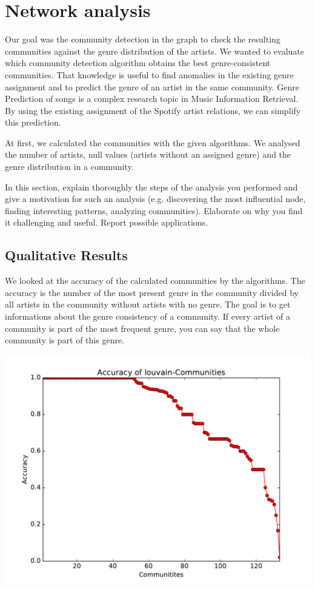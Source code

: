 \documentclass[11pt,a4paper,onecolumn,notitlepage]{article}
\begin{document}
\section{Network analysis}
Our goal was the community detection in the graph to check the resulting communities against the genre distribution of the artists. We wanted to evaluate which community detection algorithm obtains the best genre-consistent communities. That knowledge is useful to find anomalies in the existing genre assignment and to predict the genre of an artist in the same community. Genre Prediction of songs is a complex research topic in Music Information Retrieval. By using the existing assignment of the Spotify artist relations, we can simplify this prediction.

At first, we calculated the communities with the given algorithms. We analysed the number of artists, null values (artists without an assigned genre) and the genre distribution in a community.

In this section, explain thoroughly the steps of the analysis you performed and give a motivation for such an analysis (e.g. discovering the most influential node, finding interesting patterns, analyzing communities). Elaborate on why you find it challenging and useful. Report possible applications.  

\subsection{Qualitative Results}

We looked at the accuracy of the calculated communities by the algorithms. The accuracy is the number of the most present genre in the community divided by all artists in the community without artists with no genre. The goal is to get informations about the genre consistency of a community. If every artist of a community is part of the most frequent genre, you can say that the whole community is part of this genre.

\includegraphics[scale=0.4]{spotify_acc_louvain.pdf}
\end{document}
